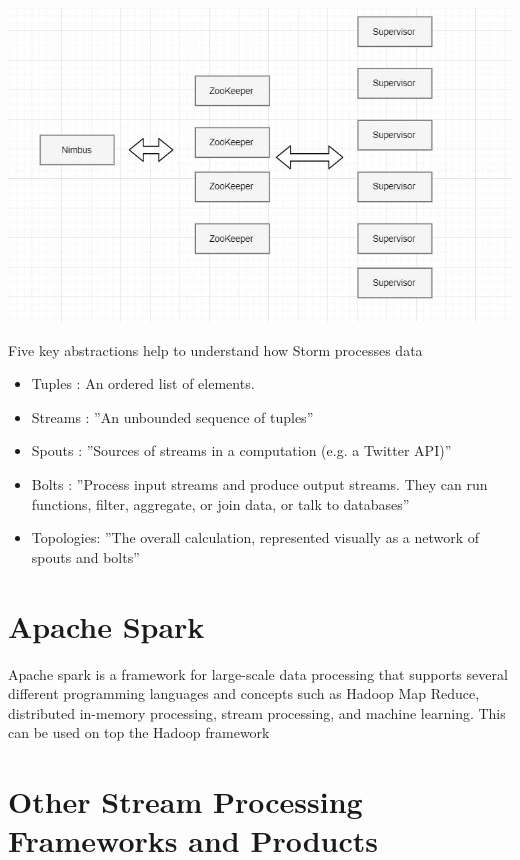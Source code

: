 \centering\includegraphics[width=\columnwidth]{images/Storm1.JPG}

  
Five key abstractions help to understand how Storm processes data

\begin{itemize}
\item Tuples : An ordered list of elements.
\item Streams : ''An unbounded sequence of tuples''~\cite{hid-sp18-514-hwp}
\item Spouts : ''Sources of streams in a computation (e.g. a Twitter API)''~\cite{hid-sp18-514-hwp}
\item Bolts : ''Process input streams and produce output streams. They can run functions, filter, aggregate, or join data, or talk to databases''~\cite{hid-sp18-514-hwp}
\item Topologies: ''The overall calculation, represented visually as a network of spouts and bolts''~\cite{hid-sp18-514-hwp}
\end{itemize}

\section{Apache Spark}
Apache spark is a framework for large-scale data processing that supports several different
programming languages and concepts such as Hadoop Map Reduce, distributed in-memory processing, 
stream processing, and machine learning. This can be used on top the Hadoop framework

\section{Other Stream Processing Frameworks and Products}

